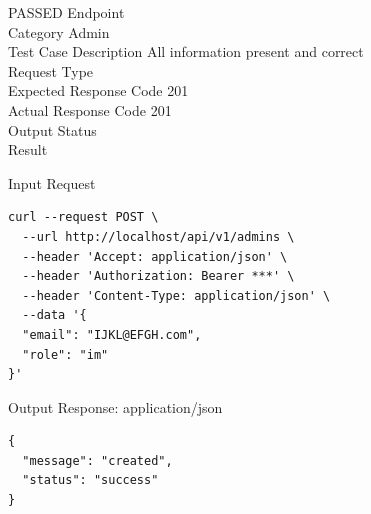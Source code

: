 \begin{testcase}{25}{PASSED}
Endpoint \hfill {}\\
Category \hfill Admin\\
Test Case Description \hfill All information present and correct\\

Request Type    \hfill {}\\
Expected Response Code    \hfill 201\\
Actual Response Code    \hfill 201\\

Output Status \hfill {}\\
Result \hfill {}

\begin{ipblock}{Input Request}
\begin{verbatim}
curl --request POST \
  --url http://localhost/api/v1/admins \
  --header 'Accept: application/json' \
  --header 'Authorization: Bearer ***' \
  --header 'Content-Type: application/json' \
  --data '{
  "email": "IJKL@EFGH.com",
  "role": "im"
}'
\end{verbatim}
\end{ipblock}

\begin{opblock}{Output Response: application/json}
\begin{verbatim}
{
  "message": "created",
  "status": "success"
}
\end{verbatim}
\end{opblock}
\end{testcase}

